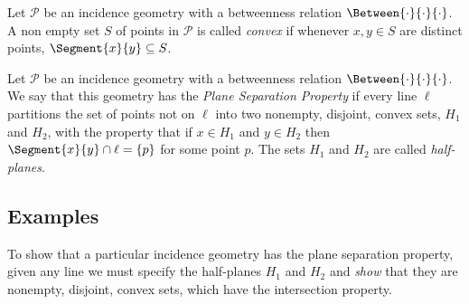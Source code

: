 \documentclass{article}
\begin{document}

\begin{dfn}[Convexity]
Let $\mathcal{P}$ be an incidence geometry with a betweenness relation $\Between{\cdot}{\cdot}{\cdot}$. A non empty set $S$ of points in $\mathcal{P}$ is called \emph{convex} if whenever $x,y \in S$ are distinct points, $\Segment{x}{y} \subseteq S$.
\end{dfn}

\begin{dfn}
Let $\mathcal{P}$ be an incidence geometry with a betweenness relation $\Between{\cdot}{\cdot}{\cdot}$. We say that this geometry has the \emph{Plane Separation Property} if every line $\ell$ partitions the set of points not on $\ell$ into two nonempty, disjoint, convex sets, $H_1$ and $H_2$, with the property that if $x \in H_1$ and $y \in H_2$ then $\Segment{x}{y} \cap \ell = \{p\}$ for some point $p$. The sets $H_1$ and $H_2$ are called \emph{half-planes}.
\end{dfn}

\subsection*{Examples}

To show that a particular incidence geometry has the plane separation property, given any line we must specify the half-planes $H_1$ and $H_2$ and \emph{show} that they are nonempty, disjoint, convex sets, which have the intersection property.
\end{document}
